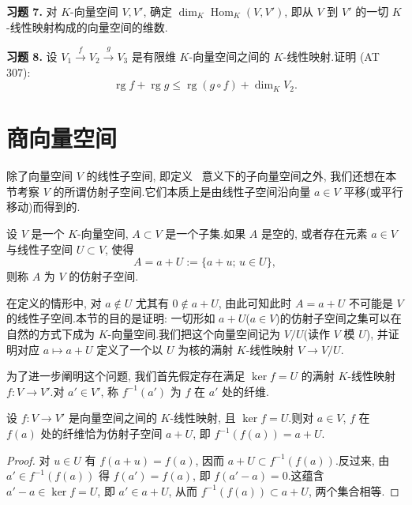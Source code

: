 \noindent\textbf{习题 7.} 对 $K$-向量空间 $V, V'$, 确定 $\dim_K \operatorname{Hom}_K(V, V')$, 即从 $V$ 到 $V'$ 的一切 $K$-线性映射构成的向量空间的维数.

\noindent\textbf{习题 8.} 设 $V_1 \xrightarrow{f} V_2 \xrightarrow{g} V_3$ 是有限维 $K$-向量空间之间的 $K$-线性映射.证明 (AT 307):
\[
\operatorname{rg} f + \operatorname{rg} g \leq \operatorname{rg}(g \circ f) + \dim_K V_2\text{.}
\]


\section{商向量空间}\label{sec:2.2}

除了向量空间 $V$ 的线性子空间, 即定义~ 意义下的子向量空间之外, 我们还想在本节考察 $V$ 的所谓仿射子空间.它们本质上是由线性子空间沿向量 $a \in V$ 平移(或平行移动)而得到的.

\begin{definition}[仿射子空间]\label{def:2.2.1}
设 $V$ 是一个 $K$-向量空间, $A \subset V$ 是一个子集.如果 $A$ 是空的, 或者存在元素 $a \in V$ 与线性子空间 $U \subset V$, 使得
\[
A = a + U := \{a + u;\, u \in U\},
\]
则称 $A$ 为 $V$ 的仿射子空间.
\end{definition}

在定义的情形中, 对 $a \notin U$ 尤其有 $0 \notin a + U$, 由此可知此时 $A = a + U$ 不可能是 $V$ 的线性子空间.本节的目的是证明: 一切形如 $a + U$($a \in V$)的仿射子空间之集可以在自然的方式下成为 $K$-向量空间.我们把这个向量空间记为 $V/U$(读作 $V$ 模 $U$), 并证明对应 $a \longmapsto a + U$ 定义了一个以 $U$ 为核的满射 $K$-线性映射 $V \longrightarrow V/U$.

为了进一步阐明这个问题, 我们首先假定存在满足 $\ker f = U$ 的满射 $K$-线性映射 $f \colon V \longrightarrow V'$.对 $a' \in V'$, 称 $f^{-1}(a')$ 为 $f$ 在 $a'$ 处的纤维.

\begin{remark}\label{rem:2.2.2}
设 $f \colon V \longrightarrow V'$ 是向量空间之间的 $K$-线性映射, 且 $\ker f = U$.则对 $a \in V$, $f$ 在 $f(a)$ 处的纤维恰为仿射子空间 $a + U$, 即 $f^{-1}(f(a)) = a + U$.
\end{remark}

\begin{proof}
对 $u \in U$ 有 $f(a + u) = f(a)$, 因而 $a + U \subset f^{-1}(f(a))$.反过来, 由 $a' \in f^{-1}(f(a))$ 得 $f(a') = f(a)$, 即 $f(a' - a) = 0$.这蕴含 $a' - a \in \ker f = U$, 即 $a' \in a + U$, 从而 $f^{-1}(f(a)) \subset a + U$, 两个集合相等.
\end{proof}

